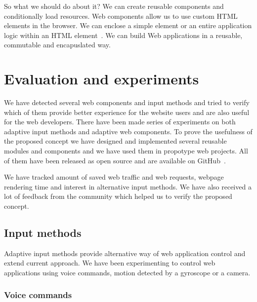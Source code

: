 \documentclass{iitsrc}
\begin{document}
So what we should do about it? We can create reusable components and conditionally load resources. Web components allow us to use custom HTML elements in the browser. We can enclose a simple element or an entire application logic within an HTML element~\cite{webcomponents}. We can build Web applications in a reusable, commutable and encapuslated way.


\section{Evaluation and experiments} %
\label{sec:evaluation_and_experiments}

We have detected several web components and input methods and tried to verify which of them provide better experience for the website users and are also useful for the web developers. There have been made series of experiments on both adaptive input methods and adaptive web components. To prove the usefulness of the proposed concept we have designed and implemented several reusable modules and components and we have used them in propotype web projects. All of them have been released as open source and are available on GitHub~\footnotemark.


We have tracked amount of saved web traffic and web requests, webpage rendering time and interest in alternative input methods. We have also received a lot of feedback from the community which helped us to verify the proposed concept.

\subsection{Input methods} %
\label{sub:input_methods}

Adaptive input methods provide alternative way of web application control and extend current approach. We have been experimenting to control web applications using voice commands, motion detected by a gyroscope or a camera.

\subsubsection*{Voice commands} %
\label{ssub:voice_commands}
\end{document}
